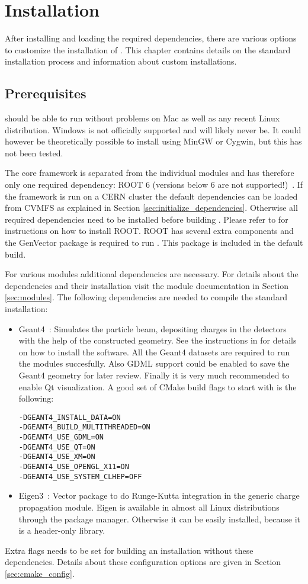 \section{Installation}
\label{sec:installation}
After installing and loading the required dependencies, there are various options to customize the installation of \apsq. This chapter contains details on the standard installation process and information about custom installations.

\subsection{Prerequisites}
\label{sec:prerequisites}
\apsq should be able to run without problems on Mac as well as any recent Linux distribution. Windows is not officially supported and will likely never be. It could however be theoretically possible to install \apsq using MinGW or Cygwin, but this has not been tested.

The core framework is separated from the individual modules and \apsq has therefore only one required dependency: ROOT 6 (versions below 6 are not supported!)~\cite{root}. If the framework is run on a CERN cluster the default dependencies can be loaded from CVMFS as explained in Section \ref{sec:initialize_dependencies}. Otherwise all required dependencies need to be installed before building \apsq. Please refer to \cite{rootinstallation} for instructions on how to install ROOT. ROOT has several extra components and the GenVector package is required to run \apsq. This package is included in the default build.

For various modules additional dependencies are necessary. For details about the dependencies and their installation visit the module documentation in Section \ref{sec:modules}. The following dependencies are needed to compile the standard installation:
\begin{itemize}
\item Geant4~\cite{geant4}: Simulates the particle beam, depositing charges in the detectors with the help of the constructed geometry. See the instructions in \cite{geant4installation} for details on how to install the software. All the Geant4 datasets are required to run the modules succesfully. Also GDML support could be enabled to save the Geant4 geometry for later review. Finally it is very much recommended to enable Qt visualization. A good set of CMake build flags to start with is the following:
\begin{verbatim}
-DGEANT4_INSTALL_DATA=ON
-DGEANT4_BUILD_MULTITHREADED=ON
-DGEANT4_USE_GDML=ON
-DGEANT4_USE_QT=ON
-DGEANT4_USE_XM=ON 
-DGEANT4_USE_OPENGL_X11=ON
-DGEANT4_USE_SYSTEM_CLHEP=OFF
\end{verbatim}
\item Eigen3~\cite{eigen3}: Vector package to do Runge-Kutta integration in the generic charge propagation module. Eigen is available in almost all Linux distributions through the package manager. Otherwise it can be easily installed, because it is a header-only library.
\end{itemize}
Extra flags needs to be set for building an \apsq installation without these dependencies. Details about these configuration options are given in Section \ref{sec:cmake_config}.

